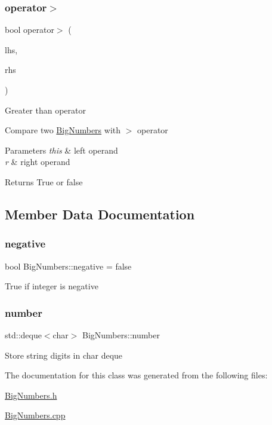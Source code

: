 \subsubsection{\texorpdfstring{operator$>$}{operator>}}
{\footnotesize\ttfamily bool operator$>$ (\begin{DoxyParamCaption}\item[{const \mbox{\hyperlink{classBigNumbers}{Big\+Numbers}} \&}]{lhs,  }\item[{const \mbox{\hyperlink{classBigNumbers}{Big\+Numbers}} \&}]{rhs }\end{DoxyParamCaption})\hspace{0.3cm}{\ttfamily [friend]}}

Greater than operator

Compare two \mbox{\hyperlink{classBigNumbers}{Big\+Numbers}} with $>$ operator 
\begin{DoxyParams}{Parameters}
{\em this} & left operand \\
\hline
{\em r} & right operand \\
\hline
\end{DoxyParams}
\begin{DoxyReturn}{Returns}
True or false 
\end{DoxyReturn}


\subsection{Member Data Documentation}
\mbox{\label{classBigNumbers_afbdf195b03dfad2a7d9f4938de3c1d3f}} 
\subsubsection{\texorpdfstring{negative}{negative}}
{\footnotesize\ttfamily bool Big\+Numbers\+::negative = false}

True if integer is negative \mbox{\label{classBigNumbers_a6c8e1ed85850facebe4786c667166a8d}} 
\subsubsection{\texorpdfstring{number}{number}}
{\footnotesize\ttfamily std\+::deque$<$char$>$ Big\+Numbers\+::number}

Store string digits in char deque 

The documentation for this class was generated from the following files\+:\begin{DoxyCompactItemize}
\item 
\mbox{\hyperlink{BigNumbers_8h}{Big\+Numbers.\+h}}\item 
\mbox{\hyperlink{BigNumbers_8cpp}{Big\+Numbers.\+cpp}}\end{DoxyCompactItemize}
